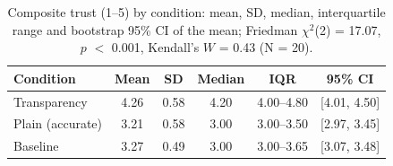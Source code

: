 \begin{table}[H]
\centering
\caption{Composite trust (1--5) by condition: mean, SD, median, interquartile range and bootstrap 95\% CI of the mean; Friedman $\chi^2$(2) = 17.07, $p$ $<$ 0.001, Kendall's $W$ = 0.43 (N = 20).}
\label{tab:us-descriptives}
{\footnotesize{}\setlength{\tabcolsep}{4pt}
\begin{tabular}{lccccc}
\toprule
\textbf{Condition} & \textbf{Mean} & \textbf{SD} & \textbf{Median} & \textbf{IQR} & \textbf{95\% CI} \\
\midrule
Transparency & 4.26 & 0.58 & 4.20 & 4.00--4.80 & [4.01, 4.50] \\
Plain (accurate) & 3.21 & 0.58 & 3.00 & 3.00--3.50 & [2.97, 3.45] \\
Baseline & 3.27 & 0.49 & 3.00 & 3.00--3.65 & [3.07, 3.48] \\
\bottomrule
\end{tabular}
}
\end{table}

